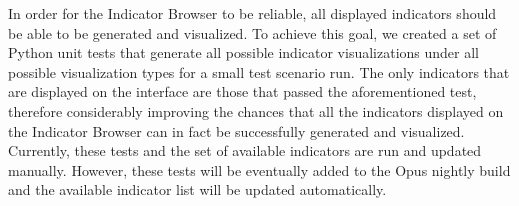 In order for the Indicator Browser to be reliable, all displayed indicators
should be able to be generated and visualized. To achieve this goal, we
created a set of Python unit tests that generate all possible indicator
visualizations under all possible visualization types for a small test
scenario run. The only indicators that are displayed on the interface are
those that passed the aforementioned test, therefore considerably improving
the chances that all the indicators displayed on the Indicator Browser can
in fact be successfully generated and visualized. Currently, these tests
and the set of available indicators are run and updated manually.  However,
these tests will be eventually added to the Opus nightly build and the
available indicator list will be updated automatically.

